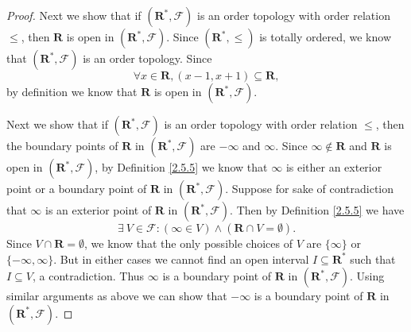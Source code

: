 \begin{proof}
    Next we show that if \((\mathbf{R}^*, \mathcal{F})\) is an order topology with order relation \(\leq\), then \(\mathbf{R}\) is open in \((\mathbf{R}^*, \mathcal{F})\).
    Since \((\mathbf{R}^*, \leq)\) is totally ordered, we know that \((\mathbf{R}^*, \mathcal{F})\) is an order topology.
    Since
    \[
        \forall x \in \mathbf{R}, (x - 1, x + 1) \subseteq \mathbf{R},
    \]
    by definition we know that \(\mathbf{R}\) is open in \((\mathbf{R}^*, \mathcal{F})\).

    Next we show that if \((\mathbf{R}^*, \mathcal{F})\) is an order topology with order relation \(\leq\), then the boundary points of \(\mathbf{R}\) in \((\mathbf{R}^*, \mathcal{F})\) are \(-\infty\) and \(\infty\).
    Since \(\infty \notin \mathbf{R}\) and \(\mathbf{R}\) is open in \((\mathbf{R}^*, \mathcal{F})\), by Definition \ref{2.5.5} we know that \(\infty\) is either an exterior point or a boundary point of \(\mathbf{R}\) in \((\mathbf{R}^*, \mathcal{F})\).
    Suppose for sake of contradiction that \(\infty\) is an exterior point of \(\mathbf{R}\) in \((\mathbf{R}^*, \mathcal{F})\).
    Then by Definition \ref{2.5.5} we have
    \[
        \exists\ V \in \mathcal{F} : (\infty \in V) \land (\mathbf{R} \cap V = \emptyset).
    \]
    Since \(V \cap \mathbf{R} = \emptyset\), we know that the only possible choices of \(V\) are \(\{\infty\}\) or \(\{-\infty, \infty\}\).
    But in either cases we cannot find an open interval \(I \subseteq \mathbf{R}^*\) such that \(I \subseteq V\), a contradiction.
    Thus \(\infty\) is a boundary point of \(\mathbf{R}\) in \((\mathbf{R}^*, \mathcal{F})\).
    Using similar arguments as above we can show that \(-\infty\) is a boundary point of \(\mathbf{R}\) in \((\mathbf{R}^*, \mathcal{F})\).


\end{proof}
